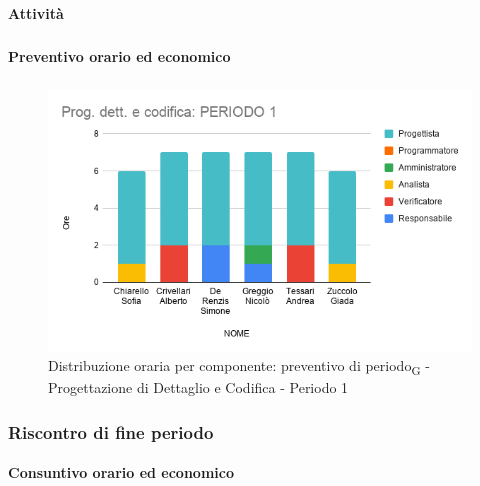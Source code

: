 \paragraph{Attività}
\subparagraph*{}

\planningTable{
	
}



\paragraph{Preventivo orario ed economico}
\subparagraph*{}

\contabilitaTable{
	
}

\begin{figure}[H]
	\centering
	\includegraphics[scale=0.6]{res/images/charts/preventivo/prog_dett_1.png}
	\caption{Distribuzione oraria per componente: preventivo di periodo\textsubscript{G} - Progettazione di Dettaglio e Codifica - Periodo 1}
\end{figure}



\subsubsection{Riscontro di fine periodo}


\paragraph{Consuntivo orario ed economico}
\subparagraph*{}

\contabilitaTable{
	
}

